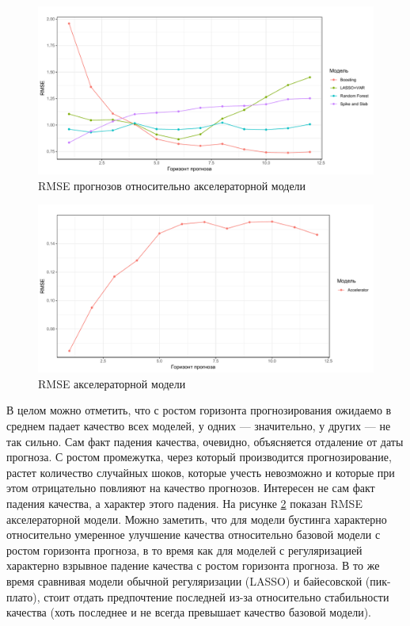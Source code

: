 \begin{figure}[hp]
    \centering
    \includegraphics[width = \textwidth]{rmse3.pdf}
    \caption{RMSE прогнозов относительно акселераторной модели}
    \label{fig:rmse3}
\end{figure}
\begin{figure}[hp]
    \centering
    \includegraphics[width = \textwidth]{rmse4.pdf}
    \caption{RMSE акселераторной модели}
    \label{fig:rmse4}
\end{figure}




В целом можно отметить, что с ростом горизонта прогнозирования ожидаемо в среднем падает качество всех моделей, у одних --- значительно, у других --- не так сильно. Сам факт падения качества, очевидно, объясняется отдаление от даты прогноза. С ростом промежутка, через который производится прогнозирование, растет количество случайных шоков, которые учесть невозможно и которые при этом отрицательно повлияют на качество прогнозов. Интересен не сам факт падения качества, а характер этого падения. На рисунке \ref{fig:rmse4} показан RMSE акселераторной модели. Можно заметить, что для модели бустинга характерно относительно умеренное улучшение качества относительно базовой модели с ростом горизонта прогноза, в то время как для моделей с регуляризацией характерно взрывное падение качества с ростом горизонта прогноза. В то же время сравнивая модели обычной регуляризации (LASSO) и байесовской (пик-плато), стоит отдать предпочтение последней из-за относительно стабильности качества (хоть последнее и не всегда превышает качество базовой модели).


